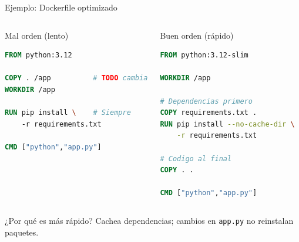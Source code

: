 \documentclass[aspectratio=169]{beamer}
\begin{document}
\begin{frame}[fragile]{Ejemplo: Dockerfile optimizado}
  \begin{columns}[T]
    \begin{alertblock}{Mal orden (lento)}
\begin{lstlisting}[language=Dockerfile, basicstyle=\ttfamily\tiny]
FROM python:3.12

COPY . /app          # TODO cambia
WORKDIR /app

RUN pip install \    # Siempre
    -r requirements.txt

CMD ["python","app.py"]
\end{lstlisting}
    \end{alertblock}
    \begin{exampleblock}{Buen orden (rápido)}
\begin{lstlisting}[language=Dockerfile, basicstyle=\ttfamily\tiny]
FROM python:3.12-slim

WORKDIR /app

# Dependencias primero
COPY requirements.txt .
RUN pip install --no-cache-dir \
    -r requirements.txt

# Codigo al final
COPY . .

CMD ["python","app.py"]
\end{lstlisting}
    \end{exampleblock}
  \end{columns}
  \vspace{-0.05cm}
  \begin{block}{¿Por qué es más rápido?}
    Cachea dependencias; cambios en \texttt{app.py} no reinstalan paquetes.
  \end{block}
\end{frame}
\end{document}
